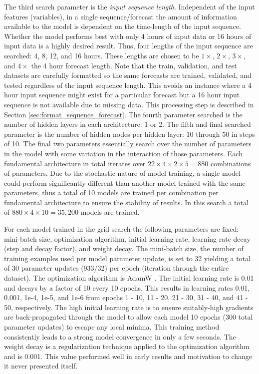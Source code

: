 The third search parameter is the \textit{input sequence length}. Independent of the input features (variables), in a single sequence/forecast the amount of information available to the model is dependent on the time-length of the input sequence. Whether the model performs best with only 4 hours of input data or 16 hours of input data is a highly desired result. Thus, four lengths of the input sequence are searched: 4, 8, 12, and 16 hours. These lengths are chosen to be $1\times$, $2\times$, $3\times$, and $4\times$ the 4 hour forecast length. Note that the train, validation, and test datasets are carefully formatted so the same forecasts are trained, validated, and tested regardless of the input sequence length. This avoids an instance where a 4 hour input sequence might exist for a particular forecast but a 16 hour input sequence is not available due to missing data. This processing step is described in Section \ref{sec:format_sequence_forecast}. The fourth parameter searched is the number of hidden layers in each architecture: 1 or 2. The fifth and final searched parameter is the number of hidden nodes per hidden layer: 10 through 50 in steps of 10. The final two parameters essentially search over the number of parameters in the model with some variation in the interaction of those parameters. Each fundamental architecture in total iterates over $22 \times 4 \times 2 \times 5 = 880$ combinations of parameters. Due to the stochastic nature of model training, a single model could perform significantly different than another model trained with the same parameters, thus a total of 10 models are trained per combination per fundamental architecture to ensure the stability of results. In this search a total of $880 \times 4 \times 10 = 35,200$ models are trained.

For each model trained in the grid search the following parameters are fixed: mini-batch size, optimization algorithm, initial learning rate, learning rate decay (step and decay factor), and weight decay. The mini-batch size, the number of training examples used per model parameter update, is set to 32 yielding a total of 30 parameter updates (933/32) per epoch (iteration through the entire dataset). The optimization algorithm is AdamW\cite{kingma2017adam} \cite{loshchilov2019decoupled}. The initial learning rate is 0.01 and decays by a factor of 10 every 10 epochs. This results in learning rates 0.01, 0.001, 1e-4, 1e-5, and 1e-6 from epochs 1 - 10, 11 - 20, 21 - 30, 31 - 40, and 41 - 50, respectively. The high initial learning rate is to ensure suitably-high gradients are back-propagated through the model to allow each model 10 epochs (300 total parameter updates) to escape any local minima. This training method consistently leads to a strong model convergence in only a few seconds. The weight decay is a regularization technique applied to the optimization algorithm \cite{loshchilov2019decoupled} and is 0.001. This value performed well in early results and motivation to change it never presented itself.

